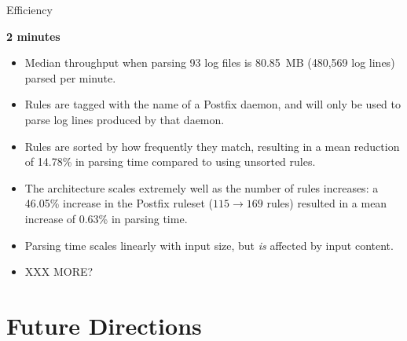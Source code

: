 \documentclass{beamer}
\newcommand{\timingnote}[1]{%
    \textbf{#1}%
}
\begin{document}
\begin{frame}{Efficiency}

    \timingnote{2 minutes}

    \begin{itemize}

        \item Median throughput when parsing 93 log files is 80.85~MB
            (480,569 log lines) parsed per minute.

        \item Rules are tagged with the name of a Postfix daemon, and will
            only be used to parse log lines produced by that daemon.

        \item Rules are sorted by how frequently they match, resulting in a
            mean reduction of 14.78\% in parsing time compared to using
            unsorted rules.

        \item The architecture scales extremely well as the number of rules
            increases: a 46.05\% increase in the Postfix ruleset ($115
            \rightarrow{} 169$ rules) resulted in a mean increase of 0.63\%
            in parsing time.

        \item Parsing time scales linearly with input size, but
            \textit{is\/} affected by input content.

        \item XXX MORE\@?

    \end{itemize}

\end{frame}

\section{Future Directions}
\end{document}
